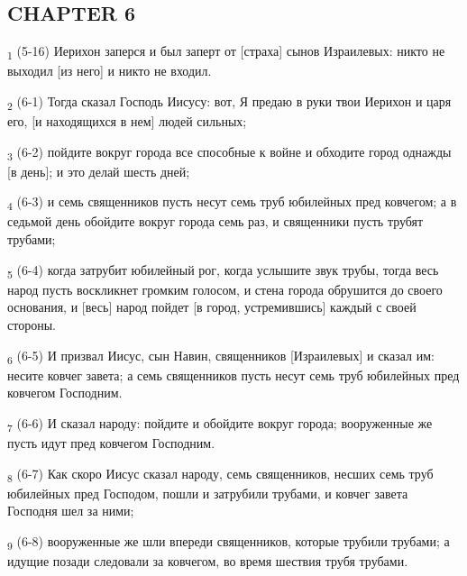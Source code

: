 \subsection{CHAPTER 6}
\begin{tcolorbox}
\textsubscript{1} (5-16) Иерихон заперся и был заперт от [страха] сынов Израилевых: никто не выходил [из него] и никто не входил.
\end{tcolorbox}
\begin{tcolorbox}
\textsubscript{2} (6-1) Тогда сказал Господь Иисусу: вот, Я предаю в руки твои Иерихон и царя его, [и находящихся в нем] людей сильных;
\end{tcolorbox}
\begin{tcolorbox}
\textsubscript{3} (6-2) пойдите вокруг города все способные к войне и обходите город однажды [в день]; и это делай шесть дней;
\end{tcolorbox}
\begin{tcolorbox}
\textsubscript{4} (6-3) и семь священников пусть несут семь труб юбилейных пред ковчегом; а в седьмой день обойдите вокруг города семь раз, и священники пусть трубят трубами;
\end{tcolorbox}
\begin{tcolorbox}
\textsubscript{5} (6-4) когда затрубит юбилейный рог, когда услышите звук трубы, тогда весь народ пусть воскликнет громким голосом, и стена города обрушится до своего основания, и [весь] народ пойдет [в город, устремившись] каждый с своей стороны.
\end{tcolorbox}
\begin{tcolorbox}
\textsubscript{6} (6-5) И призвал Иисус, сын Навин, священников [Израилевых] и сказал им: несите ковчег завета; а семь священников пусть несут семь труб юбилейных пред ковчегом Господним.
\end{tcolorbox}
\begin{tcolorbox}
\textsubscript{7} (6-6) И сказал народу: пойдите и обойдите вокруг города; вооруженные же пусть идут пред ковчегом Господним.
\end{tcolorbox}
\begin{tcolorbox}
\textsubscript{8} (6-7) Как скоро Иисус сказал народу, семь священников, несших семь труб юбилейных пред Господом, пошли и затрубили трубами, и ковчег завета Господня шел за ними;
\end{tcolorbox}
\begin{tcolorbox}
\textsubscript{9} (6-8) вооруженные же шли впереди священников, которые трубили трубами; а идущие позади следовали за ковчегом, во время шествия трубя трубами.
\end{tcolorbox}
